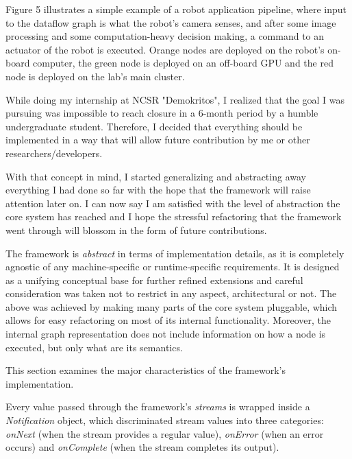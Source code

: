 \documentclass{dithesis}
\begin{document}
Figure 5 illustrates a simple example of a robot application pipeline, where input to the dataflow graph is what the robot's camera senses, and after some image processing and some computation-heavy decision making, a command to an actuator of the robot is executed. Orange nodes are deployed on the robot's on-board computer, the green node is deployed on an off-board GPU and the red node is deployed on the lab's main cluster.



While doing my internship at NCSR "Demokritos", I realized that the goal I was pursuing was impossible to reach closure in a 6-month period by a humble undergraduate student. Therefore, I decided that everything should be implemented in a way that will allow future contribution by me or other researchers/developers. 

With that concept in mind, I started generalizing and abstracting away everything I had done so far with the hope that the framework will raise attention later on. I can now say I am satisfied with the level of abstraction the core system has reached and I hope the stressful refactoring that the framework went through will blossom in the form of future contributions.


The framework is \textit{abstract} in terms of implementation details, as it is completely agnostic of any machine-specific or runtime-specific requirements. It is designed as a unifying conceptual base for further refined extensions and careful consideration was taken not to restrict in any aspect, architectural or not. The above was achieved by making many parts of the core system pluggable, which allows for easy refactoring on most of its internal functionality. Moreover, the internal graph representation does not include information on how a node is executed, but only what are its semantics.

This section examines the major characteristics of the framework's implementation.

Every value passed through the framework's \textit{streams} is wrapped inside a \textit{Notification} object, which discriminated stream values into three categories: \textit{onNext} (when the stream provides a regular value), \textit{onError} (when an error occurs) and \textit{onComplete} (when the stream completes its output).
\end{document}
